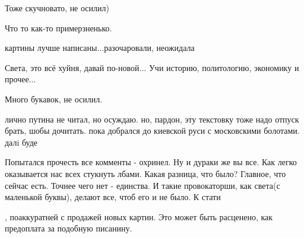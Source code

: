 \begin{itemize}
Тоже скучновато, не осилил)

 
Что то как-то примерзненько.

 
картины лучше написаны...разочаровали, неожидала

 
Света, это всё хуйня, давай по-новой... Учи историю, политологию, экономику и прочее...

 
Много букавок, не осилил.

 
лично путина не читал, но осуждаю. но, пардон, эту текстовку тоже надо отпуск брать, шобы дочитать. пока добрался до киевской руси с московскими болотами. далi буде

 

Попытался прочесть все комменты - охринел. Ну и дураки же вы все. Как легко
оказывается нас всех стукнуть лбами. Какая разница, что было? Главное, что
сейчас есть. Точнее чего нет - единства. И такие провокаторши, как света(с
маленькой буквы), делают все, чтоб его и не было. К стати

, поаккуратней с продажей новых картин. Это может быть расценено, как
предоплата за подобную писанину.




\end{itemize}
